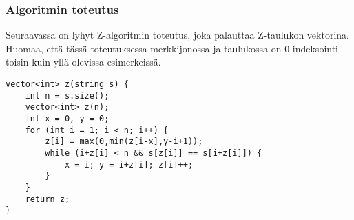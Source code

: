\subsubsection{Algoritmin toteutus}

Seuraavassa on lyhyt Z-algoritmin toteutus,
joka palauttaa Z-taulukon vektorina.
Huomaa, että tässä toteutuksessa merkkijonossa
ja taulukossa on 0-indeksointi
toisin kuin yllä olevissa esimerkeissä.

\begin{lstlisting}
vector<int> z(string s) {
    int n = s.size();
    vector<int> z(n);
    int x = 0, y = 0;
    for (int i = 1; i < n; i++) {
        z[i] = max(0,min(z[i-x],y-i+1));
        while (i+z[i] < n && s[z[i]] == s[i+z[i]]) {
            x = i; y = i+z[i]; z[i]++;
        }
    }
    return z;
}
\end{lstlisting}


